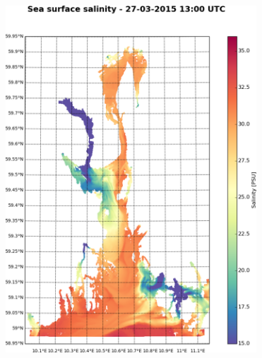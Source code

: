 \documentclass[12pt,a4paper,english]{article}
\begin{document}
\vspace{2mm}

\begin{figure}[!h]
 \begin{center}
  {\includegraphics[height=13cm]{kap5/salt_hele_0_current_crop}}	%
 \end{center}
\end{figure}



\clearpage
\thispagestyle{empty}  %

\setlength{\unitlength}{1mm}  %
\end{document}
